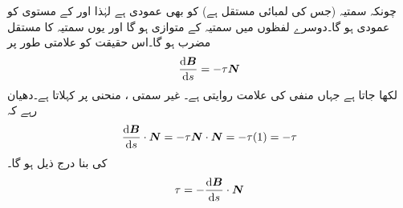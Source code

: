 چونکہ  سمتیہ   (جس کی لمبائی مستقل ہے)  کو بھی عمودی ہے لہٰذا  اور  کے مستوی کو    عمودی ہو گا۔دوسرے لفظوں میں   سمتیہ  کے متوازی ہو گا اور یوں  سمتیہ  کا مستقل مضرب ہو گا۔اس حقیقت کو علامتی  طور پر
\begin{align*}
\frac{\dif\kvec{B}}{\dif s}=-\tau\kvec{N}
\end{align*}
لکھا جاتا ہے جہاں منفی کی علامت روایتی ہے۔ غیر سمتی ،  منحنی پر   کہلاتا ہے۔دھیان رہے  کہ
\begin{align*}
\frac{\dif\kvec{B}}{\dif s}\cdot\kvec{N}=-\tau\kvec{N}\cdot\kvec{N}=-\tau(1)=-\tau
\end{align*} 
کی بنا درج ذیل ہو گا۔
\begin{align*}
\tau=-\frac{\dif\kvec{B}}{\dif s}\cdot\kvec{N}
\end{align*}

